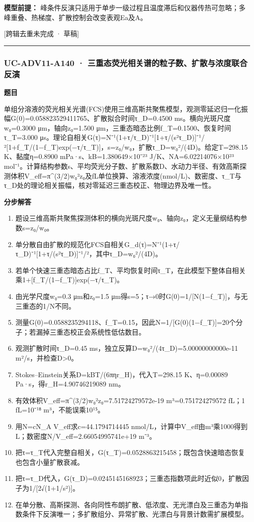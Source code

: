 \documentclass[UTF8,11pt,a4paper]{ctexart}
\begin{document}
\noindent\textbf{模型前提：}
峰条件反演只适用于单步一级过程且温度滞后和仪器传热可忽略；多峰重叠、热梯度、扩散控制会改变表观Ea及A。\par
\noindent\textcolor{red!65!black}{[跨辑去重未完成 · 草稿]} \par
\medskip\hrule\medskip
{}
\subsubsection*{UC-ADV11-A140 · 三重态荧光相关谱的粒子数、扩散与浓度联合反演}
\noindent\textbf{题目}\par
单组分溶液的荧光相关光谱(FCS)使用三维高斯共聚焦模型，观测零延迟归一化振幅G(0)=0.058823529411765、扩散拟合时间τ\_D=0.4500 ms。横向光斑尺度w₀=0.3000 μm，轴向z₀=1.500 μm，三重态暗态比例f\_T=0.1500、恢复时间τ\_T=3.000 μs。理论自相关G(τ)=N⁻¹(1+τ/τ\_D)⁻¹[1+τ/(s²τ\_D)]⁻¹/²[1+f\_T/(1−f\_T)exp(−τ/τ\_T)]，s=z₀/w₀，扩散τ\_D=w₀²/(4D)。给定T=298.15 K、黏度η=0.8900 mPa·s、kB=1.380649×10⁻²³ J/K、NA=6.02214076×10²³ mol⁻¹。计算结构参数s、平均荧光分子数、扩散系数D、水动力半径、有效高斯探测体积V\_eff=π\textasciicircum{}(3/2)w₀²z₀及fL单位换算、溶液浓度(nmol/L)、数密度、τ\_T与τ\_D处的理论相关振幅，核对零延迟三重态校正、物理边界及唯一性。\par
\medskip\noindent\textbf{分步解答}
\begin{enumerate}
\item 题设三维高斯共聚焦探测体积的横向光斑尺度w₀、轴向z₀，定义无量纲结构参数s=z₀/w₀。
\item 单分散自由扩散的规范化FCS自相关G\_d(τ)=N⁻¹(1+τ/τ\_D)⁻¹[1+τ/(s²τ\_D)]⁻¹/²，其中τ\_D=w₀²/(4D)。
\item 若单个快速三重态暗态占比f\_T、平均恢复时间τ\_T，在此模型下整体自相关乘1+[f\_T/(1−f\_T)]exp(−τ/τ\_T)。
\item 由光学尺度w₀=0.3 μm和z₀=1.5 μm得s=5；τ→0时G(0)=1/[N(1−f\_T)]，与无三重态的1/N不同。
\item 测量G(0)=0.0588235294118、f\_T=0.15，因此N=1/[G(0)(1−f\_T)]=20个分子；若漏掉三重态校正会系统性低估数目。
\item 观测扩散时间τ\_D=0.45 ms，独立反算D=w₀²/(4τ\_D)=5.00000000000e-11 m²/s，并检查D>0。
\item Stokes–Einstein关系D=kBT/(6πηr\_H)，代入T=298.15 K、η=0.00089 Pa·s，得r\_H=4.90746219089 nm。
\item 有效体积V\_eff=π\textasciicircum{}(3/2)w₀²z₀=7.51724279572e-19 m³=0.751724279572 fL；1 fL=10⁻¹⁸ m³，不能误乘10¹⁵。
\item 用N=cN\_A V\_eff求c=44.1794714445 nmol/L，计算中V\_eff由m³乘1000得到L；数密度N/V\_eff=2.66054995741e+19 m⁻³。
\item 把τ=τ\_T代入完整自相关，G(τ\_T)=0.0528863215458；既包含快速暗态恢复也包含小量扩散衰减。
\item 把τ=τ\_D代入，G(τ\_D)=0.0245145168923；三重态指数项此时近似0，扩散因子为1/[2√(1+1/s²)]。
\item 在单分散、高斯探测、各向同性布朗扩散、低浓度、无光漂白及三重态为单指数条件下反演唯一；多扩散组分、异常扩散、光漂白与背景计数需扩展模型。
\end{enumerate}
\end{document}
